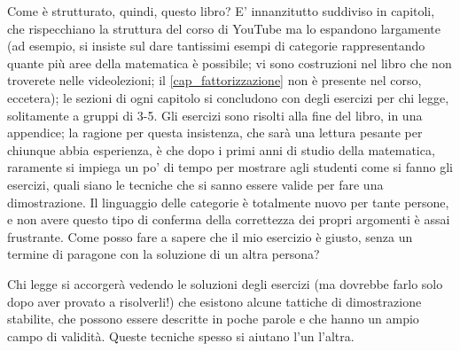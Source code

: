 \medskip
Come è strutturato, quindi, questo libro? E' innanzitutto suddiviso in capitoli, che rispecchiano la struttura del corso di YouTube ma lo espandono largamente (ad esempio, si insiste sul dare tantissimi esempi di categorie rappresentando quante più aree della matematica è possibile; vi sono costruzioni nel libro che non troverete nelle videolezioni; il \autoref{cap_fattorizzazione} non è presente nel corso, eccetera); le sezioni di ogni capitolo si concludono con degli esercizi per chi legge, solitamente a gruppi di 3-5. Gli esercizi sono risolti alla fine del libro, in una appendice; la ragione per questa insistenza, che sarà una lettura pesante per chiunque abbia esperienza, è che dopo i primi anni di studio della matematica, raramente si impiega un po' di tempo per mostrare agli studenti come si fanno gli esercizi, quali siano le tecniche che si sanno essere valide per fare una dimostrazione. Il linguaggio delle categorie è totalmente nuovo per tante persone, e non avere questo tipo di conferma della correttezza dei propri argomenti è assai frustrante. Come posso fare a sapere che il mio esercizio è giusto, senza un termine di paragone con la soluzione di un altra persona?

Chi legge si accorgerà vedendo le soluzioni degli esercizi (ma dovrebbe farlo solo dopo aver provato a risolverli!) che esistono alcune tattiche di dimostrazione stabilite, che possono essere descritte in poche parole e che hanno un ampio campo di validità. Queste tecniche spesso si aiutano l'un l'altra.

